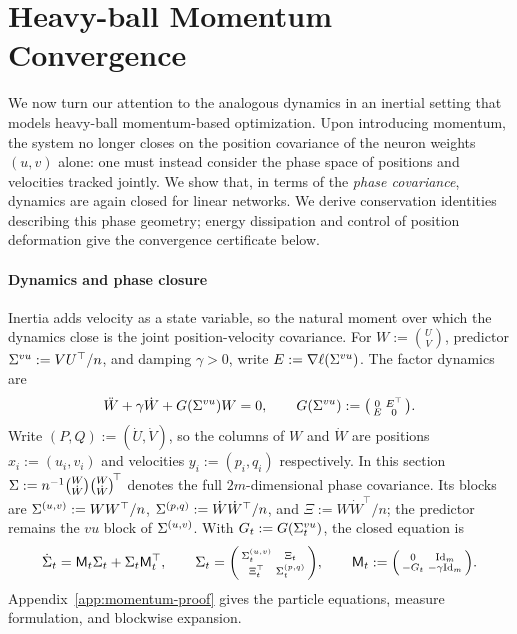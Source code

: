 \section{Heavy-ball Momentum Convergence}
\label{sec:momentum}
We now turn our attention to the analogous dynamics in an inertial setting that models heavy-ball momentum-based optimization.
Upon introducing momentum, the system no longer closes on the position covariance of the neuron weights \((u,v)\) alone: one must instead consider the phase space of positions and velocities tracked jointly.
We show that, in terms of the \emph{phase covariance}, dynamics are again closed for linear networks.
We derive conservation identities describing this phase geometry; energy dissipation and control of position deformation give the convergence certificate below.

\paragraph{Dynamics and phase closure}
Inertia adds velocity as a state variable, so the natural moment over which the dynamics close is the joint position-velocity covariance.
For $W:=\binom UV$, predictor $\Sigma^{vu}:=VU^\top/n$, and damping $\gamma>0$,
write $E:=\nabla\ell(\Sigma^{vu})$. The factor dynamics are
\begin{equation}\label{eq:finite-momentum}
 \ddot W+\gamma\dot W+G(\Sigma^{vu})W=0,\qquad
 G(\Sigma^{vu}):=\begin{psmallmatrix}0&E^\top\\E&0\end{psmallmatrix}.
\end{equation}
Write $(P,Q):=(\dot U,\dot V)$, so the columns of $W$ and $\dot W$ are
positions $x_i:=(u_i,v_i)$ and velocities $y_i:=(p_i,q_i)$ respectively.
In this section $\Sigma:=n^{-1}\binom W{\dot W}\binom W{\dot W}^{\!\top}$
denotes the full $2m$-dimensional phase covariance. Its blocks are
$\Sigma^{(u,v)}:=WW^\top/n$, $\Sigma^{(p,q)}:=\dot W\dot W^\top/n$, and
$\Xi:=W\dot W^\top/n$; the predictor remains the $vu$ block of $\Sigma^{(u,v)}$.
With $G_t:=G(\Sigma^{vu}_t)$, the closed equation is
\begin{equation}\label{eq:phase}
 \dot{\Sigma}_t=\mathsf M_t\Sigma_t+\Sigma_t\mathsf M_t^\top,\qquad
 \Sigma_t=\begin{psmallmatrix}\Sigma^{(u,v)}_t&\Xi_t\\\Xi_t^\top&\Sigma^{(p,q)}_t\end{psmallmatrix},\qquad
 \mathsf M_t:=\begin{psmallmatrix}0&\mathrm{Id}_m\\-G_t&-\gamma\mathrm{Id}_m\end{psmallmatrix}.
\end{equation}
Appendix~\ref{app:momentum-proof} gives the particle equations, measure
formulation, and blockwise expansion.

